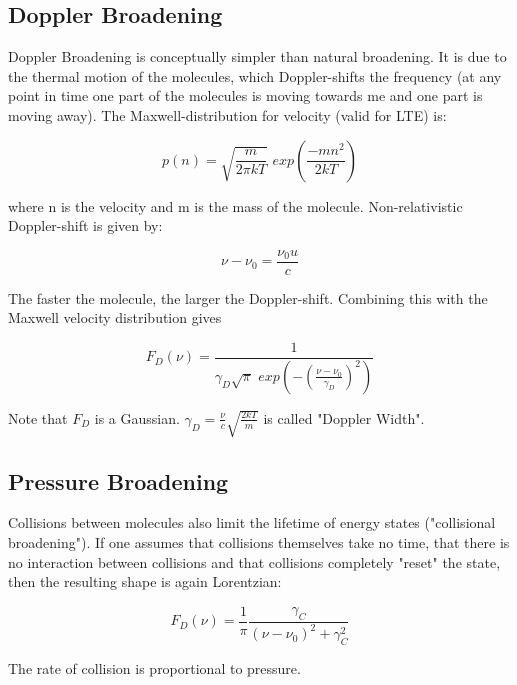 \subsection{Doppler Broadening}

Doppler Broadening is conceptually simpler than natural broadening. It is due to the thermal motion of the molecules, which Doppler-shifts the frequency (at any point in time one part of the molecules is moving towards me and one part is moving away). The Maxwell-distribution for velocity (valid for LTE) is:

\begin{equation}
p(n) = \sqrt{\frac{m}{2\pi kT}} \,\, exp(\frac{-mn^{2}}{2kT})  
\end{equation}

where n is the velocity and m is the mass of the molecule. 
Non-relativistic Doppler-shift is given by:

\begin{equation}
\nu - \nu_{0} = \frac{\nu_{0}u}{c}
\end{equation}

The faster the molecule, the larger the Doppler-shift. Combining this with the Maxwell velocity distribution gives

\begin{equation}
F_{D}(\nu) = \frac{1}{\gamma_{D}\sqrt{\pi} \,\, exp(-(\frac{\nu - \nu_{0}}{\gamma_{D}})^{2})}
\end{equation}

Note that $F_{D}$ is a Gaussian. $\gamma_{D} = \frac{\nu}{c} \sqrt{\frac{2kT}{m}}$ is called "Doppler Width". 

\subsection{Pressure Broadening}

Collisions between molecules also limit the lifetime of energy states ("collisional broadening"). If one assumes that collisions themselves take no time, that there is no interaction between collisions and that collisions completely "reset" the state, then the resulting shape is again Lorentzian:

\begin{equation}
F_{D}(\nu) = \frac{1}{\pi} \frac{\gamma_{C}}{(\nu - \nu_{0})^{2} + \gamma_{C}^{2}} 
\end{equation}

The rate of collision is proportional to pressure. \\

